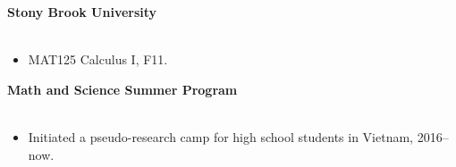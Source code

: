\documentclass[margin,line]{res}
\newenvironment{list1}{
  \begin{list}{\ding{113}}{%
      \setlength{\itemsep}{0in}
      \setlength{\parsep}{0in} \setlength{\parskip}{0in}
      \setlength{\topsep}{0in} \setlength{\partopsep}{0in}
      \setlength{\leftmargin}{0.17in}}}{\end{list}}
\begin{document}
\begin{resume}
{\bf Stony Brook University}\\
\vspace{-.3cm}
\\
\begin{itemize}
\item[] MAT125  Calculus I, F11.
\end{itemize}

{\bf Math and Science Summer Program}\\
\vspace{-.3cm}
\\
\begin{itemize}
\item[] Initiated a pseudo-research camp for high school students in Vietnam, 2016--now.
\end{itemize}



\end{resume}
\end{document}
